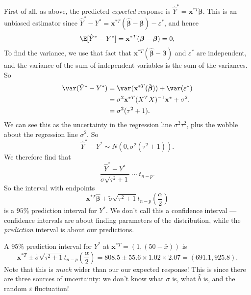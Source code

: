 \documentclass[a4paper]{article}
\begin{document}
First of all, as above, the predicted \emph{expected} response is $\hat{Y}^* = \mathbf{x}^{*T}\boldsymbol\beta$. This is an unbiased estimator since $\hat{Y}^* - Y^* = \mathbf{x}^{*T}(\hat{\boldsymbol\beta} - \boldsymbol\beta) - \varepsilon^*$, and hence
\[
  \E[\hat{Y}^* - Y^*] = \mathbf{x}^{*T}(\boldsymbol\beta - \boldsymbol\beta) = 0,
\]
To find the variance, we use that fact that $\mathbf{x}^{*T}(\hat{\boldsymbol\beta} - \boldsymbol\beta)$ and $\varepsilon^*$ are independent, and the variance of the sum of independent variables is the sum of the variances. So
\begin{align*}
  \var(\hat{Y}^* - Y^*) &= \var (\mathbf{x}^{*T}(\hat{\boldsymbol\beta})) + \var (\varepsilon^*)\\
  &= \sigma^2 \mathbf{x}^{*T}(X^TX)^{-1}\mathbf{x}^* + \sigma^2.\\
  &= \sigma^2(\tau^2 + 1).
\end{align*}
We can see this as the uncertainty in the regression line $\sigma^2\tau^2$, plus the wobble about the regression line $\sigma^2$. So
\[
  \hat{Y}^* - Y^* \sim N(0, \sigma^2(\tau^2 + 1)).
\]
We therefore find that
\[
  \frac{\hat{Y}^* - Y^*}{\tilde{\sigma}\sqrt{\tau^2 + 1}} \sim t_{n - p}.
\]
So the interval with endpoints
\[
  \mathbf{x}^{*T}\hat{\boldsymbol\beta} \pm \tilde{\sigma}\sqrt{\tau^2 + 1}t_{n - p}\left(\frac{\alpha}{2}\right)
\]
is a $95\%$ prediction interval for $Y^*$. We don't call this a confidence interval --- confidence intervals are about finding parameters of the distribution, while the \emph{prediction} interval is about our predictions.

\begin{eg}
  A $95\%$ prediction interval for $Y^*$ at $\mathbf{x}^{*T} = (1, (50 - \bar x))$ is
  \[
    \mathbf{x}^{*T}\pm \tilde{\sigma}\sqrt{\tau^2 + 1}t_{n - p}\left(\frac{\alpha}{2}\right) = 808.5\pm 55.6 \times 1.02 \times 2.07 = (691.1, 925.8).
  \]
  Note that this is \emph{much} wider than our our expected response! This is since there are three sources of uncertainty: we don't know what $\sigma$ is, what $\hat{b}$ is, and the random $\varepsilon$ fluctuation!
\end{eg}
\end{document}

